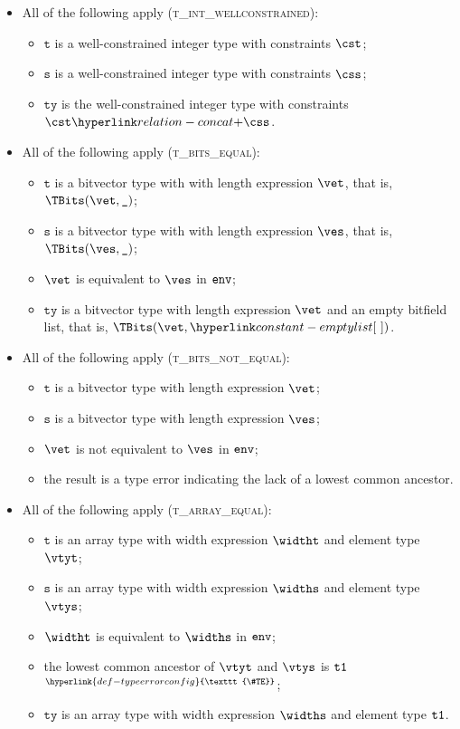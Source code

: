 \documentclass{book}
\newcommand\TypeErrorConfig[0]{\hyperlink{def-typeerrorconfig}{\texttt{\#TE}}}
\newcommand\ProseOrTypeError[0]{\hyperlink{def-proseortypeerror}{$^{\TypeErrorConfig}$}}
\newcommand\vt[0]{\texttt{t}}
\newcommand\vs[0]{\texttt{s}}
\newcommand\tty[0]{\texttt{ty}}
\begin{document}
\begin{itemize}
\begin{itemize}
    \item All of the following apply (\textsc{t\_int\_wellconstrained}):
    \begin{itemize}
      \item $\vt$ is a well-constrained integer type with constraints $\cst$;
      \item $\vs$ is a well-constrained integer type with constraints $\css$;
      \item $\tty$ is the well-constrained integer type with constraints $\cst \concat \css$.
    \end{itemize}

    \item All of the following apply (\textsc{t\_bits\_equal}):
    \begin{itemize}
      \item $\vt$ is a bitvector type with with length expression $\vet$, that is, $\TBits(\vet, \Ignore)$;
      \item $\vs$ is a bitvector type with with length expression $\ves$, that is, $\TBits(\ves, \Ignore)$;
      \item $\vet$ is equivalent to $\ves$ in $\texttt{env}$;
      \item $\tty$ is a bitvector type with length expression $\vet$ and an empty bitfield list, that is, $\TBits(\vet, \emptylist)$.
    \end{itemize}

    \item All of the following apply (\textsc{t\_bits\_not\_equal}):
    \begin{itemize}
      \item $\vt$ is a bitvector type with length expression $\vet$;
      \item $\vs$ is a bitvector type with length expression $\ves$;
      \item $\vet$ is not equivalent to $\ves$ in $\texttt{env}$;
      \item the result is a type error indicating the lack of a lowest common ancestor.
    \end{itemize}

    \item All of the following apply (\textsc{t\_array\_equal}):
    \begin{itemize}
      \item $\vt$ is an array type with width expression $\widtht$ and element type $\vtyt$;
      \item $\vs$ is an array type with width expression $\widths$ and element type $\vtys$;
      \item $\widtht$ is equivalent to $\widths$ in $\texttt{env}$;
      \item the lowest common ancestor of $\vtyt$ and $\vtys$ is $\texttt{t1}$ \ProseOrTypeError;
      \item $\tty$ is an array type with width expression $\widths$ and element type $\texttt{t1}$.
    \end{itemize}


\end{itemize}
\end{itemize}
\end{document}

